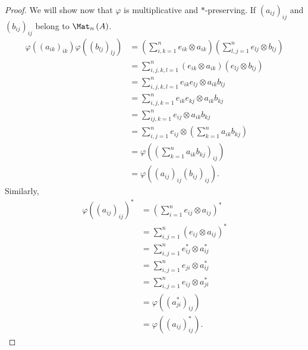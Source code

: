 \documentclass[10pt]{mypackage}
\begin{document}
\begin{proof}
  We will show now that $\varphi$ is multiplicative and $\ast$-preserving. If $\left( a_{ij} \right)_{ij}$ and $\left( b_{ij} \right)_{ij}$ belong to $\Mat_n\left( A \right)$.
  \begin{align*}
    \varphi\left( \left( a_{ik} \right)_{ik} \right)\varphi\left( \left( b_{lj} \right)_{lj} \right) &= \left( \sum_{i,k=1}^{n}e_{ik}\otimes a_{ik} \right)\left( \sum_{l,j=1}^{n}e_{lj}\otimes b_{lj} \right)\\
                                                                                                     &= \sum_{i,j,k,l=1}^{n}\left( e_{ik}\otimes a_{ik} \right)\left( e_{lj}\otimes b_{lj} \right)\\
                                                                                                     &= \sum_{i,j,k,l=1}^{n} e_{ik}e_{lj}\otimes a_{ik}b_{lj}\\
                                                                                                     &= \sum_{i,j,k=1}^{n}e_{ik}e_{kj}\otimes a_{ik}b_{kj}\\
                                                                                                     &= \sum_{ij,k=1}^{n}e_{ij}\otimes a_{ik}b_{kj}\\
                                                                                                     &= \sum_{i,j=1}^{n}e_{ij}\otimes \left( \sum_{k=1}^{n}a_{ik}b_{kj} \right)\\
                                                                                                     &= \varphi\left( \left( \sum_{k=1}^{n}a_{ik}b_{kj} \right)_{ij} \right)\\
                                                                                                     &= \varphi\left( \left( a_{ij} \right)_{ij}\left( b_{ij}\right)_{ij} \right).
  \end{align*}
  Similarly,
  \begin{align*}
    \varphi\left( \left( a_{ij} \right)_{ij} \right)^{\ast} &= \left( \sum_{i=1}^{n}e_{ij}\otimes a_{ij} \right)^{\ast}\\
                                                            &= \sum_{i,j=1}^{n}\left( e_{ij}\otimes a_{ij} \right)^{\ast}\\
                                                            &= \sum_{i,j=1}^{n}e_{ij}^{\ast}\otimes a_{ij}^{\ast}\\
                                                            &= \sum_{i,j=1}^{n}e_{ji}\otimes a_{ij}^{\ast}\\
                                                            &= \sum_{i,j=1}^{n}e_{ij}\otimes a_{ji}^{\ast}\\
                                                            &= \varphi\left( \left( a_{ji}^{\ast} \right)_{ij} \right)\\
                                                            &= \varphi\left( \left( a_{ij} \right)_{ij}^{\ast} \right).
  \end{align*}
\end{proof}
\end{document}
